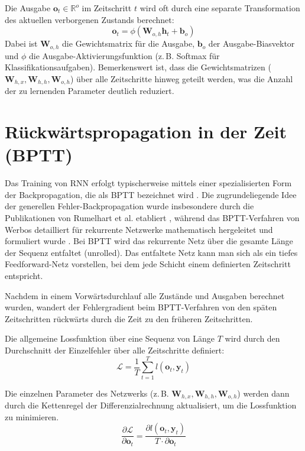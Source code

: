 Die Ausgabe $\mathbf{o}_t \in \mathbb{R}^o$ im Zeitschritt $t$ wird oft durch eine separate Transformation des aktuellen verborgenen Zustands berechnet:
\begin{equation}
\mathbf{o}_t = \phi(\mathbf{W}_{o,h} \mathbf{h}_t + \mathbf{b}_o)
\end{equation}
Dabei ist $\mathbf{W}_{o,h}$ die Gewichtsmatrix für die Ausgabe, $\mathbf{b}_o$ der Ausgabe-Biasvektor und $\phi$ die Ausgabe-Aktivierungsfunktion (z.\,B. Softmax für Klassifikationsaufgaben). Bemerkenswert ist, dass die Gewichtsmatrizen ($\mathbf{W}_{h,x}, \mathbf{W}_{h,h}, \mathbf{W}_{o,h}$) über alle Zeitschritte hinweg geteilt werden, was die Anzahl der zu lernenden Parameter deutlich reduziert.

\section[Rückwärtspropagation in der Zeit (BPTT)]{Rückwärtspropagation in der Zeit (\texorpdfstring{\acs{BPTT}}{BPTT})}
Das Training von \acs{RNN} erfolgt typischerweise mittels einer spezialisierten Form der Backpropagation, die als \acs{BPTT} bezeichnet wird \autocite{d2l}. Die zugrundeliegende Idee der generellen Fehler-Backpropagation wurde insbesondere durch die Publikationen von Rumelhart et al. etabliert \autocite{Rumelhart1986}, während das \acs{BPTT}-Verfahren von Werbos detailliert für rekurrente Netzwerke mathematisch hergeleitet und formuliert wurde \autocite{Werbos1990}. Bei \acs{BPTT} wird das rekurrente Netz über die gesamte Länge der Sequenz entfaltet (unrolled). Das entfaltete Netz kann man sich als ein tiefes Feedforward-Netz vorstellen, bei dem jede Schicht einem definierten Zeitschritt entspricht.


Nachdem in einem Vorwärtsdurchlauf alle Zustände und Ausgaben berechnet wurden, wandert der Fehlergradient beim \acs{BPTT}-Verfahren von den späten Zeitschritten rückwärts durch die Zeit zu den früheren Zeitschritten. 

Die allgemeine Lossfunktion über eine Sequenz von Länge $T$ wird durch den Durchschnitt der Einzelfehler über alle Zeitschritte definiert:
\begin{equation}
\mathcal{L} = \frac{1}{T} \sum_{t=
1}^T l(\mathbf{o}_t, \mathbf{y}_t)
\end{equation}

Die einzelnen Parameter des Netzwerks (z.\,B. $\mathbf{W}_{h,x}, \mathbf{W}_{h,h}, \mathbf{W}_{o,h}$) werden dann durch die Kettenregel der Differenzialrechnung aktualisiert, um die Lossfunktion zu minimieren. 
\begin{equation}
\frac{\partial \mathcal{L}}{\partial \mathbf{o}_t} = \frac{\partial l(\mathbf{o}_t, \mathbf{y}_t)}{T \cdot \partial \mathbf{o}_t}
\end{equation}

